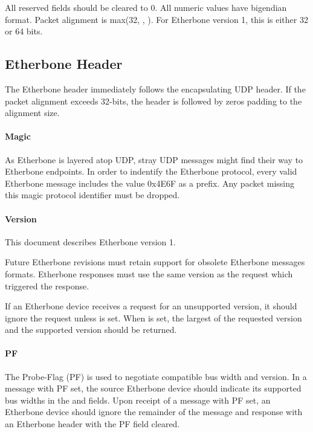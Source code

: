 \documentclass{article}
\begin{document}
All reserved fields should be cleared to 0.
All numeric values have bigendian format.
Packet alignment is max(32, , ).
For Etherbone version 1, this is either 32 or 64 bits.

\subsection{Etherbone Header}

The Etherbone header immediately follows the encapsulating UDP header.
If the packet alignment exceeds 32-bits, 
the header is followed by zeros padding to the alignment size.

\paragraph{Magic} \label{field:Magic}

As Etherbone is layered atop UDP, 
stray UDP messages might find their way to Etherbone endpoints.
In order to indentify the Etherbone protocol,
every valid Etherbone message includes the value 0x4E6F as a prefix.
Any packet missing this magic protocol identifier must be dropped.

\paragraph{Version} \label{field:Version}

This document describes Etherbone version 1.

Future Etherbone revisions must retain support for obsolete
Etherbone messages formats.
Etherbone responses must use the same version as the request
which triggered the response.

If an Etherbone device receives a request for an unsupported version,
it should ignore the request unless  is set.
When  is set, the largest of the requested version
and the supported version should be returned.

\paragraph{PF} \label{field:PF}

The Probe-Flag (PF) is used to negotiate compatible bus width and version.
In a message with PF set, the source Etherbone device should indicate its
supported bus widths in the 
 and  fields.
Upon receipt of a message with PF set, 
an Etherbone device should ignore the remainder of the message
and response with an Etherbone header with the PF field cleared.
\end{document}

